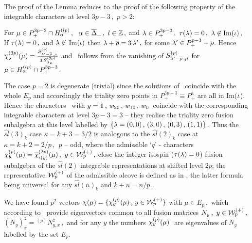\PROOF 
The proof of the Lemma reduces to the proof of the following
property of the integrable characters at level $3p-3\,,$  $p>2$:

For $\mu\in P_+^{3p-3}\cap H_{\alpha}^{(lp)}\,,
\ \ \alpha\in \overline\Delta_+\,, \ l\in \Bbb Z\,,$ and $\zl\in P_+^{3p-3}\,, \ 
\tau(\zl)=0\,,  \ \zl\not \in {\rm Im}(\iii)\,,$ 
%
\eqn{}
%
If $\tau(\lambda)=0\,,$ and $\lambda\not \in $ Im$(\iota)$ then
$\lambda+\overline{\rho}=3\,\lambda'\,,$ for some 
$\lambda'\in P_{+}^{p-3}+\overline{\rho}$. Hence 
$\overline{\chi}_{\lambda}^{(3p)}(\mu)={S_{\lambda'-\overline{\rho}\,, \mu}^{(p)}\over 3\,
S_{0\,\mu}^{(3 p)}}$ and \Vgg\ follows from the vanishing of
$S_{\lambda'-\overline{\rho}\,, \mu}^{(p)}$ for $\mu\in H_{\alpha}^{(lp)}\cap
P_+^{3p-3}\,.$
\endPROOF








\REMARK 
The case $p=2$ is degenerate (trivial) since the solutions of
\rre\ coincide with the whole $E_p$ and accordingly the triality
zero points in $P_+^{3p-3}\equiv P_+^{3}$ are all in Im($\iota$).
Hence the characters \qfch\ with $y={\bf 1}\,, \, w_{20}\,,
\, w_{10}\,, \, w_{0}\,$  coincide  with the corresponding
integrable characters at level $3p-3=3$ -- they realise the
triality zero fusion subalgebra at this level labelled by
$\{\lambda=(0,0)\,, \,(3,0)\,, \, (0,3)\,, \, (1,1)\}\,.$ 
Thus the $\widehat{sl}(3)_k$  case $\kappa=k+3=3/2$ is analogous to
the $\widehat{sl}(2)_k$ case at  $\kappa=k+2=2/p\,, \ \  p$ --
odd, where the  admissible `$q$' - characters  $\chi_y^{(p)}(\mu)=
\overline{\chi}_{\iota(y)}^{(2p)}(\mu)\,, \ y\in {\cal W}^{(+)}_p\,,$
close the integer isospin ($\tau(\lambda)=0$)   fusion subalgebra of the
$\widehat{sl}(2)$ integrable representations at shifted level $2p$;
the representative $ {\cal W}^{(+)}_p$ of the admissible alcove is defined
as in \alcII, the latter formula being universal for any
$\widehat{sl}(n)_k$ and $k+n=n/p\,.$

%
%




We have found $p^2$ vectors $\chi(\mu)=\{\chi_y^{(p)}(\mu)\,, \,
y\in {\cal W}^{(+)}_p\}$ with $\mu\in E_p\,,$ which according to \qweyl\
provide eigenvectors common to all fusion matrices $N_y\,,
\ y\in {\cal W}^{(+)}_p \,, $ $(N_y)_x^z={}^{(p)}N_{y, x}^z\,, $
and for any $y$ the numbers $\chi_y^{(p)}(\mu)\,\,$ are
eigenvalues of $N_y$ labelled by the set $E_p$.

